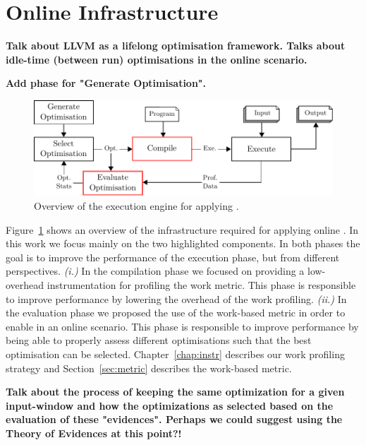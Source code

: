 \section{Online {\IterComp} Infrastructure}

\textbf{Talk about LLVM as a lifelong optimisation framework. Talks about idle-time (between run) optimisations in the online scenario.}

\textbf{Add phase for "Generate Optimisation".}
\begin{figure}[htb]
    \centering
    \includegraphics[width=\linewidth]{figs/infra-diagram}
    \caption{Overview of the execution engine for applying {\itercomp}.}
    \label{fig:infra-diagram}
\end{figure}

Figure~\ref{fig:infra-diagram} shows an overview of the infrastructure required for applying online {\itercomp}.
In this work we focus mainly on the two highlighted components.
In both phases the goal is to improve the performance of the execution phase, but from different perspectives.
\textit{(i.)} In the compilation phase we focused on providing a low-overhead instrumentation for profiling the work metric. This phase is responsible to improve performance by lowering the overhead of the work profiling.
\textit{(ii.)} In the evaluation phase we proposed the use of the work-based metric in order to enable {\itercomp} in an online scenario. This phase is responsible to improve performance by being able to properly assess different optimisations such that the best optimisation can be selected.
Chapter~\ref{chap:instr} describes our work profiling strategy and Section~\ref{sec:metric} describes the work-based metric.

\textbf{Talk about the process of keeping the same optimization for a given input-window and how the optimizations as selected based on the evaluation of these "evidences". Perhaps we could suggest using the Theory of Evidences at this point?!}
